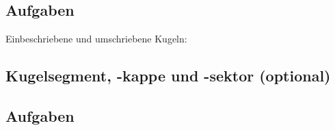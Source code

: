\subsection*{Aufgaben}

Einbeschriebene und umschriebene Kugeln:

\newpage

\subsection{Kugelsegment, -kappe und -sektor (optional)}


\subsection*{Aufgaben}
\newpage

